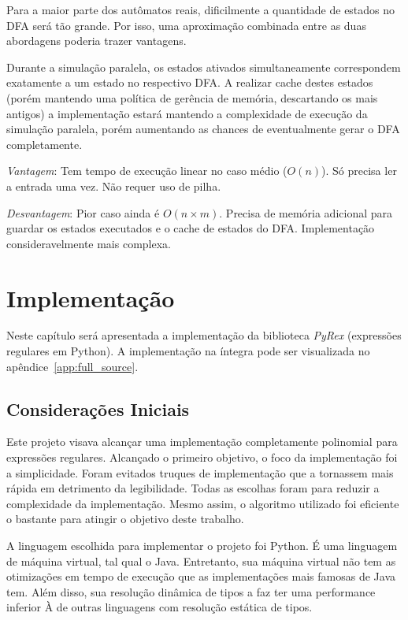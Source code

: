\documentclass[a4paper,12pt,oneside,onecolumn]{uerj}
\begin{document}
Para a maior parte dos autômatos reais, dificilmente a quantidade de estados no DFA será tão grande. Por isso, uma aproximação combinada entre as duas abordagens poderia trazer vantagens.

Durante a simulação paralela, os estados ativados simultaneamente correspondem exatamente a um estado no respectivo DFA. A realizar cache destes estados (porém mantendo uma política de gerência de memória, descartando os mais antigos) a implementação estará mantendo a complexidade de execução da simulação paralela, porém aumentando as chances de eventualmente gerar o DFA completamente.

\emph{Vantagem}: Tem tempo de execução linear no caso médio ($O(n)$). Só precisa ler a entrada uma vez. Não requer uso de pilha.

\emph{Desvantagem}: Pior caso ainda é $O(n \times m)$. Precisa de memória adicional para guardar os estados executados e o cache de estados do DFA. Implementação consideravelmente mais complexa.

\chapter{Implementação}\label{cap:implementation}

Neste capítulo será apresentada a implementação da biblioteca \emph{PyRex} (expressões regulares em Python). A implementação na íntegra pode ser visualizada no apêndice~\ref{app:full_source}.

\section{Considerações Iniciais}

Este projeto visava alcançar uma implementação completamente polinomial para expressões regulares. Alcançado o primeiro objetivo, o foco da implementação foi a simplicidade. Foram evitados truques de implementação que a tornassem mais rápida em detrimento da legibilidade. Todas as escolhas foram para reduzir a complexidade da implementação. Mesmo assim, o algoritmo utilizado foi eficiente o bastante para atingir o objetivo deste trabalho.

A linguagem escolhida para implementar o projeto foi Python. É uma linguagem de máquina virtual, tal qual o Java. Entretanto, sua máquina virtual não tem as otimizações em tempo de execução que as implementações mais famosas de Java tem. Além disso, sua resolução dinâmica de tipos a faz ter uma performance inferior À de outras linguagens com resolução estática de tipos. 
\end{document}
